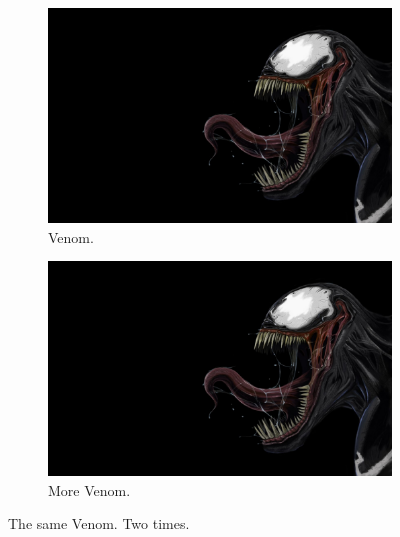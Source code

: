 \documentclass{article}
\begin{document}
\begin{figure}[h!]
    \centering
    \begin{subfigure}[b]{0.4\linewidth}
        \includegraphics[width=\linewidth]{img.jpg}
        \caption{Venom.}
    \end{subfigure}
    \begin{subfigure}[b]{0.4\linewidth}
        \includegraphics[width=\linewidth]{img.jpg}
        \caption{More Venom.}
    \end{subfigure}
    \caption{The same Venom. Two times.}
    \label{fig:coffee}
\end{figure}
\newpage
\end{document}
